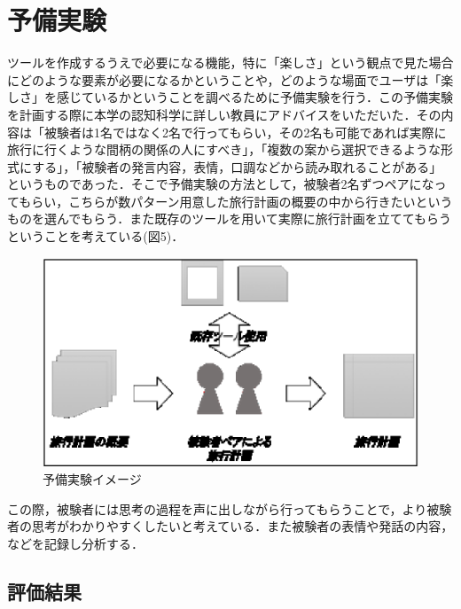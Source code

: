 \documentclass{funthesis}
\begin{document}
\chapter{予備実験}%

ツールを作成するうえで必要になる機能，特に「楽しさ」という観点で見た場合にどのような要素が必要になるかということや，どのような場面でユーザは「楽しさ」を感じているかということを調べるために予備実験を行う．この予備実験を計画する際に本学の認知科学に詳しい教員にアドバイスをいただいた．その内容は「被験者は1名ではなく2名で行ってもらい，その2名も可能であれば実際に旅行に行くような間柄の関係の人にすべき」，「複数の案から選択できるような形式にする」，「被験者の発言内容，表情，口調などから読み取れることがある」というものであった．そこで予備実験の方法として，被験者2名ずつペアになってもらい，こちらが数パターン用意した旅行計画の概要の中から行きたいというものを選んでもらう．また既存のツールを用いて実際に旅行計画を立ててもらうということを考えている(図5)．
\begin{figure}[htpb]
\begin{center}
\includegraphics[scale=0.65]{semiexp.eps}
\caption{予備実験イメージ}
\end{center}
\end{figure}

この際，被験者には思考の過程を声に出しながら行ってもらうことで，より被験者の思考がわかりやすくしたいと考えている．また被験者の表情や発話の内容，などを記録し分析する．\\

\section{評価結果}
\end{document}
